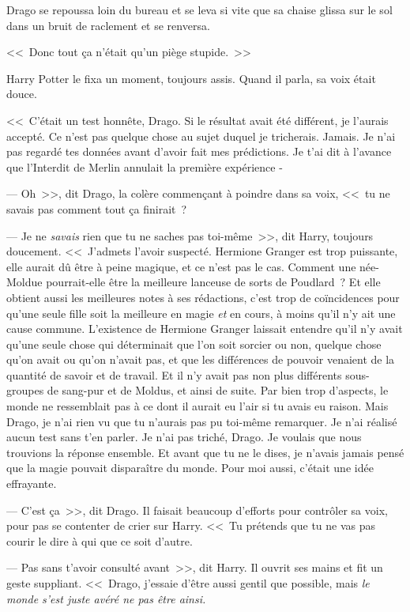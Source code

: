 Drago se repoussa loin du bureau et se leva si vite que sa chaise glissa sur le sol dans un bruit de raclement et se renversa.

<<~Donc tout ça n'était qu'un piège stupide.~>>

Harry Potter le fixa un moment, toujours assis. Quand il parla, sa voix était douce.

<<~C'était un test honnête, Drago. Si le résultat avait été différent, je l'aurais accepté. Ce n'est pas quelque chose au sujet duquel je tricherais. Jamais. Je n'ai pas regardé tes données avant d'avoir fait mes prédictions. Je t'ai dit à l'avance que l'Interdit de Merlin annulait la première expérience -

--- Oh~>>, dit Drago, la colère commençant à poindre dans sa voix, <<~tu ne savais pas comment tout ça finirait~?

--- Je ne \emph{savais} rien que tu ne saches pas toi-même~>>, dit Harry, toujours doucement. <<~J'admets l'avoir suspecté. Hermione Granger est trop puissante, elle aurait dû être à peine magique, et ce n'est pas le cas. Comment une née-Moldue pourrait-elle être la meilleure lanceuse de sorts de Poudlard~? Et elle obtient aussi les meilleures notes à ses rédactions, c'est trop de coïncidences pour qu'une seule fille soit la meilleure en magie \emph{et} en cours, à moins qu'il n'y ait une cause commune. L'existence de Hermione Granger laissait entendre qu'il n'y avait qu'une seule chose qui déterminait que l'on soit sorcier ou non, quelque chose qu'on avait ou qu'on n'avait pas, et que les différences de pouvoir venaient de la quantité de savoir et de travail. Et il n'y avait pas non plus différents sous-groupes de sang-pur et de Moldus, et ainsi de suite. Par bien trop d'aspects, le monde ne ressemblait pas à ce dont il aurait eu l'air si tu avais eu raison. Mais Drago, je n'ai rien vu que tu n'aurais pas pu toi-même remarquer. Je n'ai réalisé aucun test sans t'en parler. Je n'ai pas triché, Drago. Je voulais que nous trouvions la réponse ensemble. Et avant que tu ne le dises, je n'avais jamais pensé que la magie pouvait disparaître du monde. Pour moi aussi, c'était une idée effrayante.

--- C'est ça~>>, dit Drago. Il faisait beaucoup d'efforts pour contrôler sa voix, pour pas se contenter de crier sur Harry. <<~Tu prétends que tu ne vas pas courir le dire à qui que ce soit d'autre.

--- Pas sans t'avoir consulté avant~>>, dit Harry. Il ouvrit ses mains et fit un geste suppliant. <<~Drago, j'essaie d'être aussi gentil que possible, mais \emph{le monde s'est juste avéré ne pas être ainsi.}


